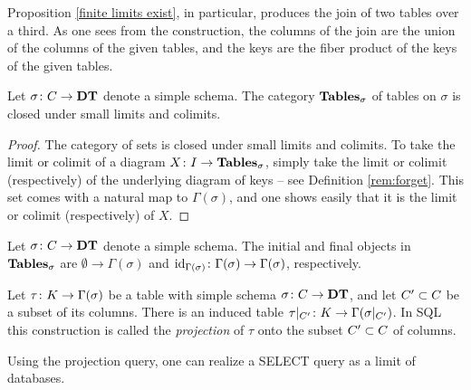 \documentclass{amsart}
\begin{document}
Proposition \ref{finite limits exist}, in particular, produces the join of two tables over a third.  As one sees from the construction, the columns of the join are the union of the columns of the given tables, and the keys are the fiber product of the keys of the given tables.

\begin{lemma}

Let $\sigma\taking C\to\DT$ denote a simple schema.  The category $\Tables_\sigma$ of tables on $\sigma$ is closed under small limits and colimits.

\end{lemma}

\begin{proof}

The category of sets is closed under small limits and colimits.  To take the limit or colimit of a diagram $X\taking I\to\Tables_\sigma$, simply take the limit or colimit (respectively) of the underlying diagram of keys -- see Definition \ref{rem:forget}.  This set comes with a natural map to $\Gamma(\sigma)$, and one shows easily that it is the limit or colimit (respectively) of $X$.

\end{proof}

\begin{example}\label{ex:initial and final over sigma}

Let $\sigma\taking C\to\DT$ denote a simple schema.  The initial and final objects in $\Tables_\sigma$ are $\emptyset\to\Gamma(\sigma)$ and $\id_{\Gamma(\sigma)}\taking\Gamma(\sigma)\to\Gamma(\sigma)$, respectively.

\end{example}

\begin{construction}

Let $\tau\taking K\to\Gamma(\sigma)$ be a table with simple schema $\sigma\taking C\to\DT$, and let $C'\ss C$ be a subset of its columns.  There is an induced table $\tau|_{C'}\taking K\to\Gamma(\sigma|_{C'})$.  In SQL this construction is called the {\em projection} of $\tau$ onto the subset $C'\ss C$ of columns.

\end{construction}

Using the projection query, one can realize a SELECT query as a limit of databases.  
\end{document}
